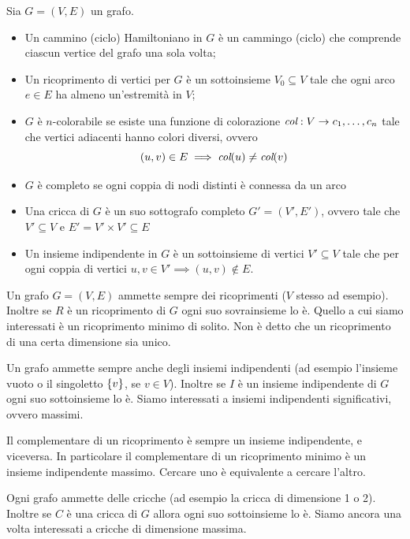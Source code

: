 \begin{defn}
    Sia $G = (V,E)$ un grafo.
    \begin{itemize}
        \item Un cammino (ciclo) Hamiltoniano in $G$ è un cammingo (ciclo) che comprende ciascun
        vertice del grafo una sola volta;
        \item Un ricoprimento di vertici per $G$ è un sottoinsieme $V_{0} \subseteq V$ tale che
        ogni arco $e \in E$ ha almeno un'estremità in $V$;
        \item $G$ è $n$-colorabile se esiste una funzione di colorazione $\textit{col}: V \to
        c_{1},\dotsc,c_{n}$ tale che vertici adiacenti hanno colori diversi, ovvero
        \begin{equation*}
            (u,v) \in E \implies \textit{col}(u) \not= \textit{col}(v)
        \end{equation*}
        \item $G$ è completo se ogni coppia di nodi distinti è connessa da un arco
        \item Una cricca di $G$ è un suo sottografo completo $G' = (V',E')$, ovvero tale che $V'
        \subseteq V$ e $E' = V' \times V' \subseteq E$
        \item Un insieme indipendente in $G$ è un sottoinsieme di vertici $V' \subseteq V$ tale che
        per ogni coppia di vertici $u,v \in V' \implies (u,v) \notin E$.
    \end{itemize}
\end{defn}

Un grafo $G=(V,E)$ ammette sempre dei ricoprimenti ($V$ stesso ad esempio). Inoltre se $R$ è un
ricoprimento di $G$ ogni suo sovrainsieme lo è. Quello a cui siamo interessati è un ricoprimento
minimo di solito. Non è detto che un ricoprimento di una certa dimensione sia unico.

Un grafo ammette sempre anche degli insiemi indipendenti (ad esempio l'insieme vuoto o il singoletto
$\{v\}$, se $v \in V$). Inoltre se $I$ è un insieme indipendente di $G$ ogni suo sottoinsieme lo
è. Siamo interessati a insiemi indipendenti significativi, ovvero massimi.

Il complementare di un ricoprimento è sempre un insieme indipendente, e viceversa. In particolare il
complementare di un ricoprimento minimo è un insieme indipendente massimo. Cercare uno è
equivalente a cercare l'altro.

Ogni grafo ammette delle cricche (ad esempio la cricca di dimensione 1 o 2). Inoltre se $C$ è una
cricca di $G$ allora ogni suo sottoinsieme lo è. Siamo ancora una volta interessati a cricche di
dimensione massima.

